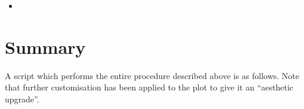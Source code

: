 \documentclass[letterpaper,10pt,english]{sphinxmanual}
\begin{document}
\begin{sphinxVerbatim}[commandchars=\\\{\}]
\end{sphinxVerbatim}
\begin{itemize}
\item {} 
\sphinxAtStartPar
{}

\end{itemize}


\section{Summary}
\label{\detokenize{walkthrough:summary}}
\sphinxAtStartPar
A script which performs the entire procedure described above is as follows.
Note that further customisation has been applied to the plot to give it an
“aesthetic upgrade”.
\end{document}
